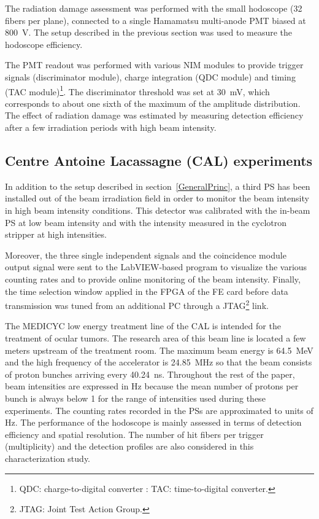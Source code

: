 \documentclass[a4paper,11pt]{article}
\begin{document}
The radiation damage assessment was performed with the small hodoscope (32 fibers per plane), connected to a single Hamamatsu multi-anode PMT biased at 800~V. The setup described in the previous section was used to measure the hodoscope efficiency.  

The PMT readout was performed with various NIM modules to provide trigger signals (discriminator module), charge integration (QDC module) and timing (TAC module)\footnote{QDC: charge-to-digital converter : TAC: time-to-digital converter.}. The discriminator threshold was set at 30~mV, which corresponds to about one sixth of the maximum of the amplitude distribution. The effect of radiation damage was estimated by measuring detection efficiency after a few irradiation periods with high beam intensity.

\subsection{Centre Antoine Lacassagne (CAL) experiments}
\label{In-beam_tests}

In addition to the setup described in section~\ref{GeneralPrinc}, a third PS has been installed out of the beam irradiation field in order to monitor the beam intensity in high beam intensity conditions. This detector was calibrated with the in-beam PS at low beam intensity and with the intensity measured in the cyclotron stripper at high intensities. 

Moreover, the three single independent signals and the coincidence module output signal were sent to the LabVIEW-based program to visualize the various counting rates and to provide online monitoring of the beam intensity. 
Finally, the time selection window applied in the FPGA of the FE card before data transmission was tuned from an additional PC through a JTAG\footnote{JTAG: Joint Test Action Group.} link.

The MEDICYC low energy treatment line of the CAL is intended for the treatment of ocular tumors. The research area of this beam line is located a few meters upstream of the treatment room. The maximum beam energy is 64.5~MeV and the high frequency of the accelerator is 24.85~MHz so that the beam consists of proton bunches arriving every 40.24~ns. Throughout the rest of the paper, beam intensities are expressed in Hz because the mean number of protons per bunch is always below 1 for the range of intensities used during these experiments. The counting rates recorded in the PSs are approximated to units of Hz.
The performance of the hodoscope is mainly assessed in terms of detection efficiency and spatial resolution. The number of hit fibers per trigger (multiplicity) and the detection profiles are also considered in this characterization study.
\end{document}
